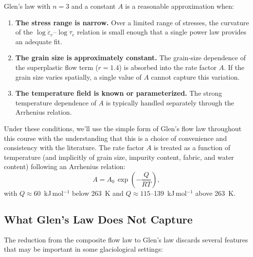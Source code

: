 \documentclass[11pt]{article}
\begin{document}
Glen's law with $n = 3$ and a constant $A$ is a reasonable approximation when:
\begin{enumerate}
  \item \textbf{The stress range is narrow.}  Over a limited range of stresses, the curvature of the $\log\dot{\varepsilon}_e$--$\log\tau_e$ relation is small enough that a single power law provides an adequate fit.
  \item \textbf{The grain size is approximately constant.}  The grain-size dependence of the superplastic flow term ($r = 1.4$) is absorbed into the rate factor $A$.  If the grain size varies spatially, a single value of $A$ cannot capture this variation.
  \item \textbf{The temperature field is known or parameterized.}  The strong temperature dependence of $A$ is typically handled separately through the Arrhenius relation.
\end{enumerate}

\noindent Under these conditions, we'll use the simple form of Glen's flow law throughout this course with the understanding that this is a choice of convenience and consistency with the literature.  The rate factor $A$ is treated as a function of temperature (and implicitly of grain size, impurity content, fabric, and water content) following an Arrhenius relation:
\begin{equation}
  A = A_0\,\exp\!\left(-\frac{Q}{RT}\right),
  \label{eq:arrhenius}
\end{equation}
with $Q \approx 60$~kJ\,mol$^{-1}$ below 263~K and $Q \approx 115$--139~kJ\,mol$^{-1}$ above 263~K.

\subsection{What Glen's Law Does Not Capture}

The reduction from the composite flow law to Glen's law discards several features that may be important in some glaciological settings:
\end{document}
